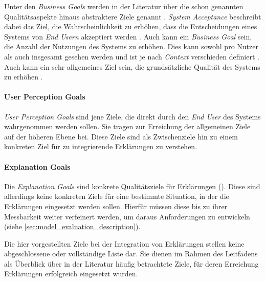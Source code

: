 Unter den \textit{Business Goals} werden in der Literatur über die schon genannten Qualitätsaspekte hinaus abstraktere Ziele genannt \cite[vgl. z.~B.][]{cirqueira_scenario-based_2020, nunes_systematic_2017, ribera2019can}. \textit{System Acceptance} beschreibt dabei das Ziel, die Wahrscheinlichkeit zu erhöhen, dass die Entscheidungen eines Systems von \textit{End Usern} akzeptiert werden \cite{cirqueira_scenario-based_2020}. Auch kann ein \textit{Business Goal} sein, die Anzahl der Nutzungen des Systems zu erhöhen. Dies kann sowohl pro Nutzer als auch insgesamt gesehen werden und ist je nach \textit{Context} verschieden definiert \cite{nunes_systematic_2017}. Auch kann ein sehr allgemeines Ziel sein, die grundsätzliche Qualität des Systems zu erhöhen \cite{schneider2012abenteuer}.

\paragraph{User Perception Goals} \textit{User Perception Goals} sind jene Ziele, die direkt durch den \textit{End User} des Systems wahrgenommen werden sollen. Sie tragen zur Erreichung der allgemeinen Ziele auf der höheren Ebene bei. Diese Ziele sind als Zwischenziele hin zu einem konkreten Ziel für zu integrierende Erklärungen zu verstehen.

\paragraph{Explanation Goals} Die \textit{Explanation Goals} sind \glqq konkrete Qualitätsziele\grqq{} für Erklärungen (\cite[vgl.][]{schneider2012abenteuer}). Diese sind allerdings keine konkreten Ziele für eine bestimmte Situation, in der die Erklärungen eingesetzt werden sollen. Hierfür müssen diese bis zu ihrer Messbarkeit weiter verfeinert werden, um daraus Anforderungen zu entwickeln (siehe \autoref{sec:model_evaluation_description}).

\bigskip

Die hier vorgestellten Ziele bei der Integration von Erklärungen stellen keine abgeschlossene oder vollständige Liste dar. Sie dienen im Rahmen des Leitfadens als Überblick über in der Literatur häufig betrachtete Ziele, für deren Erreichung Erklärungen erfolgreich eingesetzt wurden.

\newpage

\smallskip

\noindent{}

